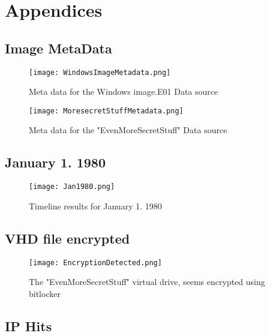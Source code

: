 \documentclass[
	letterpaper, %
	10pt, %
	unnumberedsections, %
	twoside, %
]{APAAssignment}
\begin{document}
\chapter{Appendices}
\begin{appendices}

	\section{Image MetaData}\label{app:MetaData}


	\begin{figure}[!h] %
		\centering
		\texttt{[image: WindowsImageMetadata.png]}
		\caption{Meta data for the Windows image.E01 Data source}
		\label{fig:windowsIageMetadata}
	\end{figure}


	\begin{figure}[!h] %
		\centering
		\texttt{[image: MoresecretStuffMetadata.png]}
		\caption{Meta data for the "EvenMoreSecretStuff" Data source}
		\label{fig:evenMoreSecretStuffMetaData}
	\end{figure}


	\clearpage
	\section{January 1. 1980}\label{app:Jan1980}


	\begin{figure}[!h] %
		\centering
		\texttt{[image: Jan1980.png]}
		\caption{Timeline results for January 1. 1980}
		\label{fig:Jan1980}
	\end{figure}

	\section{VHD file encrypted}\label{app:SecretDriveEncrypted}

	\begin{figure}[!h] %
		\centering
		\texttt{[image: EncryptionDetected.png]}
		\caption{The "EvenMoreSecretStuff" virtual drive, seems encrypted using bitlocker}
		\label{fig:MoreSecretStuffEncrypted}
	\end{figure}

	\section{IP Hits}\label{app:IpHits}


\end{appendices}
\end{document}
